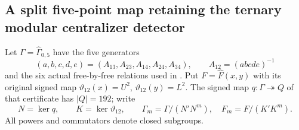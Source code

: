 \subsection{A split five-point map retaining the ternary modular centralizer detector}

Let $\Gamma=\widehat\Gamma_{0,5}$ have the five
generators
\[
 (a,b,c,d,e)=(A_{13},A_{23},A_{14},A_{24},A_{34}),
 \qquad A_{12}=(abcde)^{-1}
                                                               \tag{TMR.1}
\]
and the six actual free-by-free relations used in
.
Put $F=\widehat F(x,y)$ with its original signed
map $\vartheta_{12}(x)=U^2$, $\vartheta_{12}(y)=L^2$.
The signed map $q:\Gamma\twoheadrightarrow Q$ of
that certificate has $|Q|=192$; write
\[
 N=\ker q,\qquad K=\ker\vartheta_{12},\qquad
 \Gamma_m=\Gamma/(N'N^m),\quad F_m=F/(K'K^m).
                                                               \tag{TMR.2}
\]
All powers and commutators denote closed subgroups.

